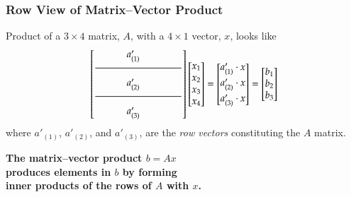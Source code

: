 \documentclass[10pt]{beamer}
\newcommand{\matdim}[2]{\ensuremath{#1\times#2}}
\begin{document}
\begin{frame}
\frametitle{Row View of Matrix--Vector Product}

Product of a \matdim{3}{4} matrix, $A$, with a \matdim{4}{1} vector, $x$, looks like
\begin{equation*}
    \begin{bmatrix}\begin{matrix} & & a'_{(1)}& & & \end{matrix} \\
                   \dfrac{\makebox[1.2in]{}}{\makebox[1.2in]{}} \\
                   \begin{matrix} & & a'_{(2)}& & & \end{matrix} \\
                   \dfrac{\makebox[1.2in]{}}{\makebox[1.2in]{}} \\
                   \begin{matrix} & & a'_{(3)}& & & \end{matrix}
    \end{bmatrix}
    \begin{bmatrix} x_1 \\ x_2 \\ x_3 \\ x_4 \end{bmatrix}
    =
    \begin{bmatrix} a'_{(1)}\cdot x \\[4pt] a'_{(2)}\cdot x \\[4pt] a'_{(3)}\cdot x \end{bmatrix}
    =
    \begin{bmatrix} b_1 \\ b_2 \\ b_3 \end{bmatrix}
\end{equation*}
where $a'_{(1)}$, $a'_{(2)}$, and $a'_{(3)}$, are the \emph{row vectors}
constituting the $A$ matrix.

\vspace{3ex}

\begin{center}
    \begin{minipage}{4.75in}
        \bfseries
        The matrix--vector product $b = Ax$\\
        produces elements in $b$ by forming\\
        inner products of the rows of $A$ with $x$.
    \end{minipage}
\end{center}
\end{frame}
\end{document}
